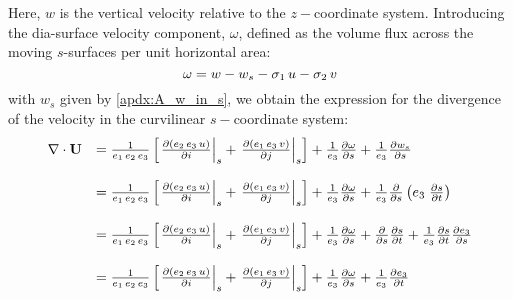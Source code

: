 \documentclass[../main/NEMO_manual]{subfiles}
\begin{document}
Here, $w$ is the vertical velocity relative to the $z-$coordinate system.
Introducing the dia-surface velocity component,
$\omega $, defined as the volume flux across the moving $s$-surfaces per unit horizontal area:
\begin{equation}
  \label{apdx:A_w_s}
  \omega  = w - w_s - \sigma_1 \,u - \sigma_2 \,v    \\
\end{equation}
with $w_s$ given by \autoref{apdx:A_w_in_s},
we obtain the expression for the divergence of the velocity in the curvilinear $s-$coordinate system:
\begin{subequations}
  \begin{align*}
    {
    \begin{array}{*{20}l}
      \nabla \cdot {\rm {\bf U}}
      &= \frac{1}{e_1 \,e_2 \,e_3 }    \left[
		  \left.  \frac{\partial (e_2 \,e_3 \,u)}{\partial i} \right|_s
        +\left.  \frac{\partial (e_1 \,e_3 \,v)}{\partial j} \right|_s        \right]
        + \frac{1}{e_3 } \frac{\partial \omega }{\partial s}
        + \frac{1}{e_3 } \frac{\partial w_s       }{\partial s} \\ \\
      &= \frac{1}{e_1 \,e_2 \,e_3 }    \left[
		  \left.  \frac{\partial (e_2 \,e_3 \,u)}{\partial i} \right|_s
        +\left.  \frac{\partial (e_1 \,e_3 \,v)}{\partial j} \right|_s        \right]
        + \frac{1}{e_3 } \frac{\partial \omega }{\partial s}
        + \frac{1}{e_3 } \frac{\partial}{\partial s}  \left(  e_3 \; \frac{\partial s}{\partial t}   \right) \\ \\
      &= \frac{1}{e_1 \,e_2 \,e_3 }    \left[
		  \left.  \frac{\partial (e_2 \,e_3 \,u)}{\partial i} \right|_s
        +\left.  \frac{\partial (e_1 \,e_3 \,v)}{\partial j} \right|_s        \right]
        + \frac{1}{e_3 } \frac{\partial \omega }{\partial s}
        + \frac{\partial}{\partial s} \frac{\partial s}{\partial t}
        + \frac{1}{e_3 } \frac{\partial s}{\partial t} \frac{\partial e_3}{\partial s} \\ \\
      &= \frac{1}{e_1 \,e_2 \,e_3 }    \left[
		  \left.  \frac{\partial (e_2 \,e_3 \,u)}{\partial i} \right|_s
        +\left.  \frac{\partial (e_1 \,e_3 \,v)}{\partial j} \right|_s        \right]
        + \frac{1}{e_3 } \frac{\partial \omega }{\partial s}
        + \frac{1}{e_3 } \frac{\partial e_3}{\partial t}
    \end{array}
        }
  \end{align*}
\end{subequations}
\end{document}
